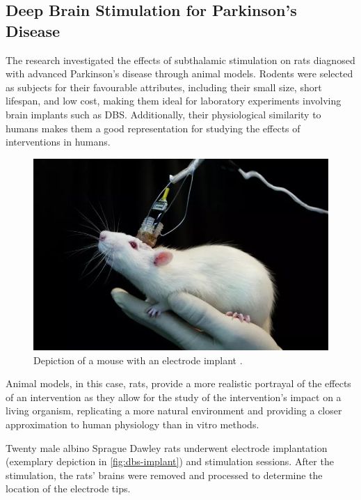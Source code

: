 \documentclass[10pt]{article}
\begin{document}
\begin{sloppypar}
  \subsection{Deep Brain Stimulation for Parkinson’s Disease}
  \label{sec:deep-brain-stimulation}

  The research investigated the effects of subthalamic stimulation on rats diagnosed with advanced Parkinson’s disease through animal models. Rodents were selected as subjects for their favourable attributes, including their small size, short lifespan, and low cost, making them ideal for laboratory experiments involving brain implants such as DBS. Additionally, their physiological similarity to humans makes them a good representation for studying the effects of interventions in humans.

  \vspace{10pt} %
  \begin{figure}[ht]
    \centering
    \includegraphics[width=\textwidth]{figures/scientist-deep-brain-stimulation.png}
    \caption[Depiction of a mouse with an electrode implant]{Depiction of a mouse with an electrode implant \citep{sharma_scientists_2017}.}
    \label{fig:dbs-implant}
  \end{figure}

  Animal models, in this case, rats, provide a more realistic portrayal of the effects of an intervention as they allow for the study of the intervention’s impact on a living organism, replicating a more natural environment and providing a closer approximation to human physiology than in vitro methods.

  Twenty male albino Sprague Dawley rats underwent electrode implantation (exemplary depiction in \autoref{fig:dbs-implant}) and stimulation sessions. After the stimulation, the rats’ brains were removed and processed to determine the location of the electrode tips.


\end{sloppypar}
\end{document}
